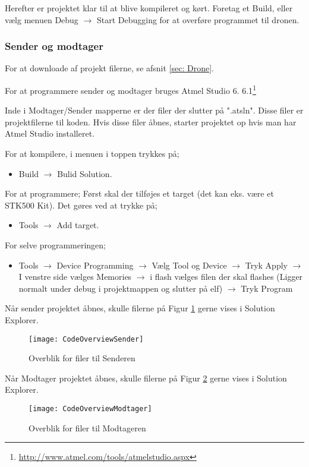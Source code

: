 \documentclass[Main]{subfiles}
\begin{document}
Herefter er projektet klar til at blive kompileret og kørt.
Foretag et Build, eller vælg menuen Debug $\rightarrow$ Start Debugging for at overføre programmet til dronen.


\subsubsection{Sender og modtager}
For at downloade af projekt filerne, se afsnit \ref{sec: Drone}.

For at programmere sender og modtager bruges Atmel Studio 6. 6.1\footnote{\url{http://www.atmel.com/tools/atmelstudio.aspx}} 

Inde i Modtager/Sender mapperne er der filer der slutter på ".atsln". Disse filer er projektfilerne til koden. Hvis disse filer åbnes, starter projektet op hvis man har Atmel Studio installeret.

For at kompilere, i menuen i toppen trykkes på;
\begin{itemize}
\item Build $\rightarrow$ Bulid Solution.
\end{itemize}

For at programmere;
Først skal der tilføjes et target (det kan eks. være et STK500 Kit). Det gøres ved at trykke på;
\begin{itemize}
\item Tools $\rightarrow$ Add target.
\end{itemize}
For selve programmeringen;
\begin{itemize}
\item Tools $\rightarrow$ Device Programming $\rightarrow$ Vælg Tool og Device $\rightarrow$ Tryk Apply $\rightarrow$ I venstre side vælges Memories $\rightarrow$ i flash vælges filen der skal flashes (Ligger normalt under debug i projektmappen og slutter på elf) $\rightarrow$ Tryk Program
\end{itemize}

Når sender projektet åbnes, skulle filerne på Figur \ref{Fig:CodeOverviewSender} gerne vises i Solution Explorer.

\begin{figure}[H]
\centering
\texttt{[image: CodeOverviewSender]}
\caption{Overblik for filer til Senderen}
\label{Fig:CodeOverviewSender}
\end{figure}

Når Modtager projektet åbnes, skulle filerne på Figur \ref{Fig:CodeOverviewModtager} gerne vises i Solution Explorer.

\begin{figure}[H]
\centering
\texttt{[image: CodeOverviewModtager]}
\caption{Overblik for filer til Modtageren}
\label{Fig:CodeOverviewModtager}
\end{figure}
\end{document}
